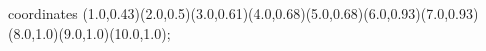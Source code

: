 					coordinates { (1.0,0.43)(2.0,0.5)(3.0,0.61)(4.0,0.68)(5.0,0.68)(6.0,0.93)(7.0,0.93)(8.0,1.0)(9.0,1.0)(10.0,1.0)};